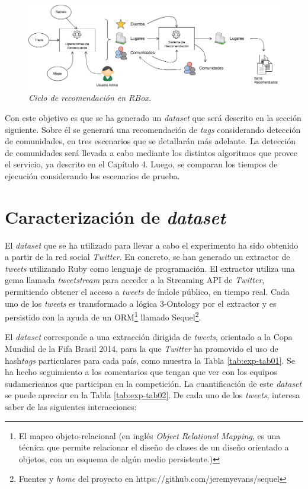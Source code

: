 \begin{figure}
  \centering
  \includegraphics[scale=.5]{images/Figura5-1}
  \caption{\em Ciclo de recomendación en RBox.}
  \label{fig:exp-im1}
\end{figure}

Con este objetivo es que se ha generado un \textit{data\textit{set}} que será descrito en la sección siguiente. Sobre él se generará una recomendación de \textit{tags} considerando detección de comunidades, en tres escenarios que se detallarán más adelante. La detección de comunidades será llevada a cabo mediante los distintos algoritmos que provee el servicio, ya descrito en el Capítulo 4. Luego, se comparan los tiempos de ejecución considerando los escenarios de prueba.

\section{Caracterización de \textit{data\textit{set}}}

El \textit{data\textit{set}} que se ha utilizado para llevar a cabo el experimento ha sido obtenido a partir de la red social \textit{Twitter}. En concreto, se han generado un extractor de \textit{tweets} utilizando Ruby como lenguaje de programación. El extractor utiliza una gema llamada \textit{\textit{tweets}tream} para acceder a la Streaming API de \textit{Twitter}, permitiendo obtener el acceso a \textit{tweets} de índole público, en tiempo real. Cada uno de los \textit{tweets} es transformado a lógica 3-Ontology por el extractor y es persistido con la ayuda de un ORM\footnote{El mapeo objeto-relacional (en inglés \textit{Object Relational Mapping}, es una técnica que permite relacionar el diseño de clases de un diseño orientado a objetos, con un esquema de algún medio persistente.)} llamado Sequel\footnote{Fuentes y \textit{home} del proyecto en https://github.com/jeremyevans/sequel}.

El \textit{data\textit{set}} corresponde a una extracción dirigida de \textit{tweets}, orientado a la Copa Mundial de la Fifa Brasil 2014, para la que \textit{Twitter} ha promovido el uso de hash\textit{tags} particulares para cada país, como muestra la Tabla \ref{tab:exp-tab01}. Se ha hecho seguimiento a los comentarios que tengan que ver con los equipos sudamericanos que participan en la competición. La cuantificación de este \textit{data\textit{set}} se puede apreciar en la Tabla \ref{tab:exp-tab02}.  De cada uno de los \textit{tweets}, interesa saber de las siguientes interacciones:

